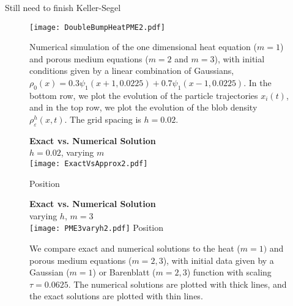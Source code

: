 \documentclass[11pt,leqno]{amsart}
\theoremstyle{definition}
\def\epsilon{\varepsilon}
\begin{document}
{\color{Aquamarine} Still need to finish Keller-Segel }



\begin{figure}[!ht] 
\centering
\hspace*{-1.4cm}
\texttt{[image: DoubleBumpHeatPME2.pdf]}
	\caption{Numerical simulation of the one dimensional heat equation ($m=1$) and porous medium equations ($m=2$ and $m=3$), with initial conditions given by a linear combination of Gaussians, $\rho_0(x) = 0.3 \psi_1(x+1,0.0225)+0.7 \psi_1(x-1, 0.0225)$. In the bottom row, we plot the evolution of the particle trajectories $x_i(t)$, and in the top row, we plot the evolution of the blob density $\rho^h_\epsilon(x,t)$. The grid spacing is $h = 0.02$. 
}
\label{doublebumpdiffusion}
\end{figure}




\begin{figure}[!ht] 
\centering
\textbf{Exact vs. Numerical Solution} \\
$h = 0.02$, varying $m$ \\ \smallskip
\hspace*{-1.4cm}
\texttt{[image: ExactVsApprox2.pdf]}

{\footnotesize Position} \hspace{4.3in} \

\textbf{Exact vs. Numerical Solution} \\
varying $h$, $m = 3$ \\ \smallskip
\hspace*{-1.35cm}
\texttt{[image: PME3varyh2.pdf]}
{\footnotesize Position} \hspace{4.3in} \
	\caption{We compare exact and numerical solutions to the heat ($m=1)$ and porous medium equations ($m=2,3$), with initial data given by a Gaussian ($m=1$) or Barenblatt ($m=2, 3$) function with scaling $\tau = 0.0625$. The numerical solutions are plotted with thick lines, and the exact solutions are plotted with thin lines.}
	\label{exactnumericaldensity}
\end{figure}
\end{document}
